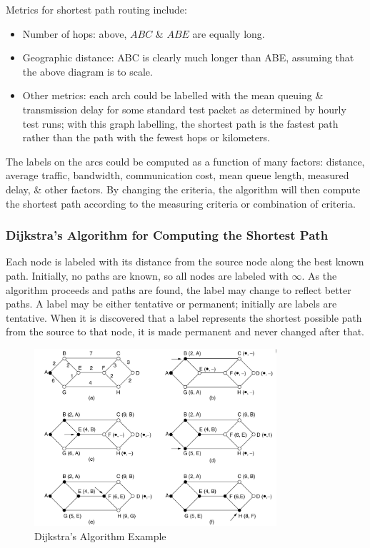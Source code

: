 \documentclass[a4paper,11pt]{article}
\begin{document}
Metrics for shortest path routing include:
\begin{itemize}
    \item   Number of hops: above, $ABC$ \& $ABE$ are 
            equally long.
    \item   Geographic distance: ABC is clearly much longer than ABE, assuming that the above diagram is to scale.
    \item   Other metrics: each arch could be labelled with the mean queuing \& transmission delay for some 
            standard test packet as determined by hourly test runs; with this graph labelling, the shortest 
            path is the fastest path rather than the path with the fewest hops or kilometers.
\end{itemize}

The labels on the arcs could be computed as a function of many factors: distance, average traffic, bandwidth, 
communication cost, mean queue length, measured delay, \& other factors.
By changing the criteria, the algorithm will then compute the shortest path according to the measuring criteria
or combination of criteria.

\subsubsection{Dijkstra's Algorithm for Computing the Shortest Path}
Each node is labeled with its distance from the source node along the best known path. 
Initially, no paths are known, so all nodes are labeled with $\infty$.
As the algorithm proceeds and paths are found, the label may change to reflect better paths.
A label may be either tentative or permanent; initially are labels are tentative. 
When it is discovered that a label represents the shortest possible path from the source to that node, it is made
permanent and never changed after that.
\begin{figure}[H]
    \centering
    \includegraphics[width=0.8\textwidth]{./images/dijkstra.png}
    \caption{Dijkstra's Algorithm Example}
\end{figure}
\end{document}
